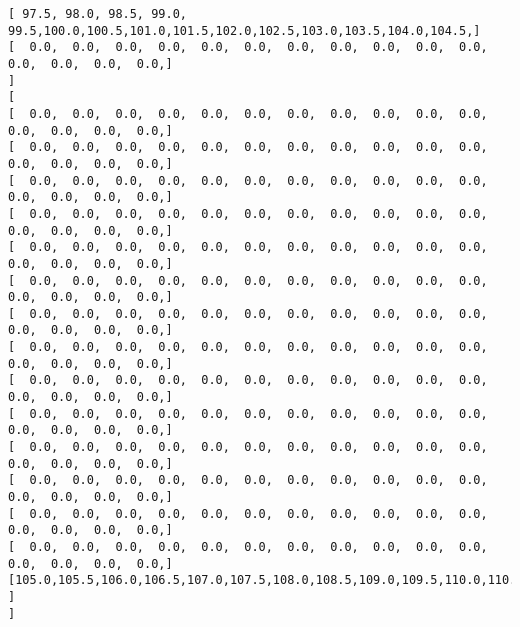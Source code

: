 \documentclass[11pt]{article}
\begin{document}
\begin{Verbatim}[commandchars=\\\{\}]
[  97.5,  98.0,  98.5,  99.0,  99.5, 100.0, 100.5, 101.0, 101.5, 102.0, 102.5, 103.0, 103.5, 104.0, 104.5, ]
[   0.0,   0.0,   0.0,   0.0,   0.0,   0.0,   0.0,   0.0,   0.0,   0.0,   0.0,   0.0,   0.0,   0.0,   0.0, ]
]
[
[   0.0,   0.0,   0.0,   0.0,   0.0,   0.0,   0.0,   0.0,   0.0,   0.0,   0.0,   0.0,   0.0,   0.0,   0.0, ]
[   0.0,   0.0,   0.0,   0.0,   0.0,   0.0,   0.0,   0.0,   0.0,   0.0,   0.0,   0.0,   0.0,   0.0,   0.0, ]
[   0.0,   0.0,   0.0,   0.0,   0.0,   0.0,   0.0,   0.0,   0.0,   0.0,   0.0,   0.0,   0.0,   0.0,   0.0, ]
[   0.0,   0.0,   0.0,   0.0,   0.0,   0.0,   0.0,   0.0,   0.0,   0.0,   0.0,   0.0,   0.0,   0.0,   0.0, ]
[   0.0,   0.0,   0.0,   0.0,   0.0,   0.0,   0.0,   0.0,   0.0,   0.0,   0.0,   0.0,   0.0,   0.0,   0.0, ]
[   0.0,   0.0,   0.0,   0.0,   0.0,   0.0,   0.0,   0.0,   0.0,   0.0,   0.0,   0.0,   0.0,   0.0,   0.0, ]
[   0.0,   0.0,   0.0,   0.0,   0.0,   0.0,   0.0,   0.0,   0.0,   0.0,   0.0,   0.0,   0.0,   0.0,   0.0, ]
[   0.0,   0.0,   0.0,   0.0,   0.0,   0.0,   0.0,   0.0,   0.0,   0.0,   0.0,   0.0,   0.0,   0.0,   0.0, ]
[   0.0,   0.0,   0.0,   0.0,   0.0,   0.0,   0.0,   0.0,   0.0,   0.0,   0.0,   0.0,   0.0,   0.0,   0.0, ]
[   0.0,   0.0,   0.0,   0.0,   0.0,   0.0,   0.0,   0.0,   0.0,   0.0,   0.0,   0.0,   0.0,   0.0,   0.0, ]
[   0.0,   0.0,   0.0,   0.0,   0.0,   0.0,   0.0,   0.0,   0.0,   0.0,   0.0,   0.0,   0.0,   0.0,   0.0, ]
[   0.0,   0.0,   0.0,   0.0,   0.0,   0.0,   0.0,   0.0,   0.0,   0.0,   0.0,   0.0,   0.0,   0.0,   0.0, ]
[   0.0,   0.0,   0.0,   0.0,   0.0,   0.0,   0.0,   0.0,   0.0,   0.0,   0.0,   0.0,   0.0,   0.0,   0.0, ]
[   0.0,   0.0,   0.0,   0.0,   0.0,   0.0,   0.0,   0.0,   0.0,   0.0,   0.0,   0.0,   0.0,   0.0,   0.0, ]
[ 105.0, 105.5, 106.0, 106.5, 107.0, 107.5, 108.0, 108.5, 109.0, 109.5, 110.0, 110.5, 111.0, 111.5, 112.0, ]
]
]


\end{Verbatim}
\end{document}
